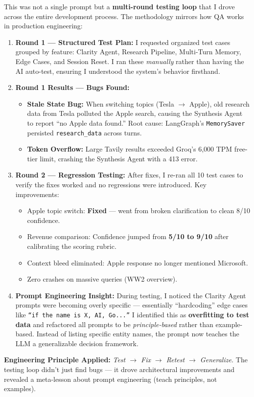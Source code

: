 \documentclass[12pt, a4paper]{article}
\begin{document}
\begin{reasonbox}
This was not a single prompt but a \textbf{multi-round testing loop} that I drove across the entire development process. The methodology mirrors how QA works in production engineering:

\begin{enumerate}[leftmargin=1.5em]
    \item \textbf{Round 1 — Structured Test Plan:} I requested organized test cases grouped by feature: Clarity Agent, Research Pipeline, Multi-Turn Memory, Edge Cases, and Session Reset. I ran these \textit{manually} rather than having the AI auto-test, ensuring I understood the system's behavior firsthand.
    \item \textbf{Round 1 Results — Bugs Found:}
    \begin{itemize}[leftmargin=1em]
        \item \textbf{Stale State Bug:} When switching topics (Tesla $\to$ Apple), old research data from Tesla polluted the Apple search, causing the Synthesis Agent to report ``no Apple data found.'' Root cause: LangGraph's \texttt{MemorySaver} persisted \texttt{research\_data} across turns.
        \item \textbf{Token Overflow:} Large Tavily results exceeded Groq's 6,000 TPM free-tier limit, crashing the Synthesis Agent with a 413 error.
    \end{itemize}
    \item \textbf{Round 2 — Regression Testing:} After fixes, I re-ran all 10 test cases to verify the fixes worked and no regressions were introduced. Key improvements:
    \begin{itemize}[leftmargin=1em]
        \item Apple topic switch: \textbf{Fixed} — went from broken clarification to clean 8/10 confidence.
        \item Revenue comparison: Confidence jumped from \textbf{5/10 to 9/10} after calibrating the scoring rubric.
        \item Context bleed eliminated: Apple response no longer mentioned Microsoft.
        \item Zero crashes on massive queries (WW2 overview).
    \end{itemize}
    \item \textbf{Prompt Engineering Insight:} During testing, I noticed the Clarity Agent prompts were becoming overly specific — essentially ``hardcoding'' edge cases like \texttt{``if the name is X, AI, Go...''} I identified this as \textbf{overfitting to test data} and refactored all prompts to be \textit{principle-based} rather than example-based. Instead of listing specific entity names, the prompt now teaches the LLM a generalizable decision framework.
\end{enumerate}

\textbf{Engineering Principle Applied:} \textit{Test $\to$ Fix $\to$ Retest $\to$ Generalize.} The testing loop didn't just find bugs — it drove architectural improvements and revealed a meta-lesson about prompt engineering (teach principles, not examples).
\end{reasonbox}
\end{document}
